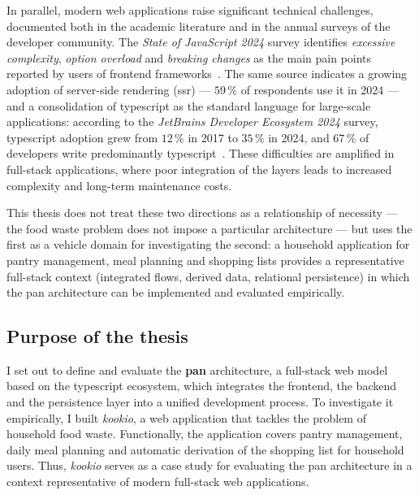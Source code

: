 In parallel, modern \gls{web} applications raise significant technical challenges, documented both in the academic literature and in the annual surveys of the developer community.
The \textit{State of JavaScript 2024} survey identifies \emph{excessive complexity}, \emph{option overload} and \emph{breaking changes} as the main pain points reported by users of frontend frameworks~\cite{stateOfJS2024}.
The same source indicates a growing adoption of server-side rendering (\acrshort{ssr}) --- \(59\,\%\) of respondents use it in 2024 --- and a consolidation of \gls{typescript} as the standard language for large-scale applications: according to the \textit{JetBrains Developer Ecosystem 2024} survey, \gls{typescript} adoption grew from \(12\,\%\) in 2017 to \(35\,\%\) in 2024, and \(67\,\%\) of developers write predominantly \gls{typescript}~\cite{jetbrainsJsSurvey2024}.
These difficulties are amplified in full-stack applications, where poor integration of the layers leads to increased complexity and long-term maintenance costs.

This thesis does not treat these two directions as a relationship of necessity --- the food waste problem does not impose a particular architecture --- but uses the first as a vehicle domain for investigating the second: a household application for pantry management, meal planning and shopping lists provides a representative full-stack context (integrated flows, derived data, relational persistence) in which the \gls{pan} architecture can be implemented and evaluated empirically.

\subsection{Purpose of the thesis}\label{sec:scop}
I set out to define and evaluate the \textbf{\gls{pan}} architecture, a full-stack \gls{web} model based on the \gls{typescript} ecosystem, which integrates the frontend, the backend and the persistence layer into a unified development process.
To investigate it empirically, I built \textit{\gls{kookio}}, a \gls{web} application that tackles the problem of household food waste.
Functionally, the application covers pantry management, daily meal planning and automatic derivation of the shopping list for household users.
Thus, \textit{\gls{kookio}} serves as a case study for evaluating the \gls{pan} architecture in a context representative of modern full-stack \gls{web} applications.

